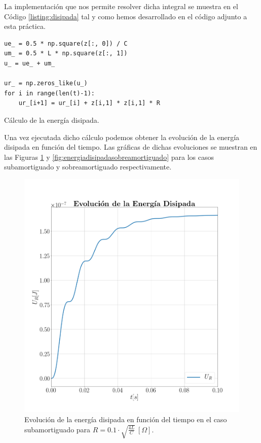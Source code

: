 \documentclass[journal]{IEEEtran}
\newenvironment{code}{\captionsetup{type=listing}}{\par\addvspace{\baselineskip}}
\begin{document}
La implementación que nos permite resolver dicha integral se muestra en el Código \ref{listing:disipada} tal y como hemos desarrollado en el código adjunto a esta práctica.

\bigskip

\begin{code}
    \begin{verbatim}
ue_ = 0.5 * np.square(z[:, 0]) / C
um_ = 0.5 * L * np.square(z[:, 1])
u_ = ue_ + um_

ur_ = np.zeros_like(u_)
for i in range(len(t)-1):
    ur_[i+1] = ur_[i] + z[i,1] * z[i,1] * R
    \end{verbatim}
    \caption{Cálculo de la energía disipada.}
    \label{listing:disipada}
\end{code}

Una vez ejecutada dicho cálculo podemos obtener la evolución de la energía disipada en función del tiempo. Las gráficas de dichas evoluciones se muestran en las Figuras \ref{fig:energiadisipadasubamortiguado} y \ref{fig:energiadisipadasobreamortiguado} para los casos subamortiguado y sobreamortiguado respectivamente.

\begin{figure}[!htb]
    \centering
    \includegraphics[width=\linewidth,trim={40 70 70 70},clip]{energiadisipadasubamortiguado.png}
    \caption{Evolución de la energía disipada en función del tiempo en el caso subamortiguado para $R=0.1 \cdot\sqrt{\frac{4L}{C}}~[\Omega]$.}
    \label{fig:energiadisipadasubamortiguado}
\end{figure}
\end{document}
